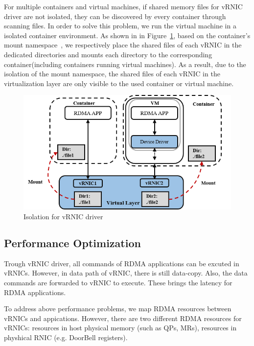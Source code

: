 For multiple containers and virtual machines, if shared memory files for vRNIC driver are not isolated, they can be discovered by every container through scanning files. In order to solve this problem, we run the virtual machine in a isolated container environment. As shown in in Figure~\ref{fig:interface-isolate}, based on the container's mount namespace~\cite{mount-ns}, we respectively place the shared files of each vRNIC in the dedicated directories and mounts each directory to the corresponding container(including containers running virtual machines). As a result, due to the isolation of the mount namespace, the shared files of each vRNIC in the virtualization layer are only visible to the used container or virtual machine.  

\begin{figure}[!ht]
	\centering
	\includegraphics[width=1.0\linewidth]{images/interface-isolate}
	\caption{Isolation for vRNIC driver}
	\label{fig:interface-isolate}
\end{figure}


\subsection{Performance Optimization}

Trough vRNIC driver, all commands of RDMA applications can be excuted in vRNICs. However, in data path of vRNIC, there is still data-copy. Also, the data commands are forwarded to vRNIC to execute. These brings the latency for RDMA applications. 

To address above performance problems, we map RDMA resources between vRNICs and appications. However, there are two different RDMA resources for vRNICs: resources in host physical memory (such as QPs, MRs), resources in physhical RNIC (e.g. DoorBell registers). 

